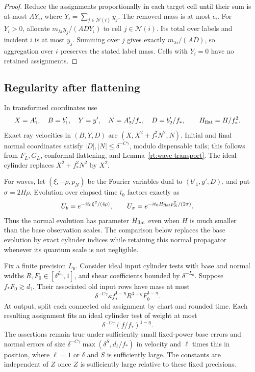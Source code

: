 \begin{proof}
Reduce the assignments proportionally in each target cell until their
sum is at most $A Y_i$, where $Y_i=\sum_{j\in\mathcal N(i)}y_j$.
The removed mass is at most $\epsilon_i$.
For $Y_i>0$, allocate
$m_{\lambda i}y_j/(ADY_i)$ to cell $j\in\mathcal N(i)$.
Its total over labels and incident $i$ is at most $y_j$.
Summing over $j$ gives exactly $m_{\lambda i}/(AD)$, so aggregation
over $i$ preserves the stated label mass.  Cells with $Y_i=0$ have
no retained assignments.
\end{proof}

\subsection{Regularity after flattening}

In transformed coordinates use
\[
 X=A'_1,\quad B=b'_1,\quad Y=y',\quad
 N=A'_2/f_*,\quad D=b'_2/f_* ,\qquad H_{\rm flat}=H/f_*^2.
\]
Exact ray velocities in $(B,Y,D)$ are
$(X,X^2+f_*^2N^2,N)$.  Initial and final normal coordinates satisfy
$|D|,|N|\le\delta^{-C\gamma}$, modulo dispensable tails; this follows
from $F_L,G_L$, conformal flattening, and Lemma~\ref{rt:wave-transport}.
The ideal cylinder replaces $X^2+f_*^2N^2$ by $X^2$.

For waves, let $(\xi,-\rho,p_N)$ be the Fourier variables dual to
$(b'_1,y',D)$, and put $\sigma=2H\rho$.  Evolution over elapsed time
$t_0$ factors exactly as
\begin{equation}\label{rt:flat-propagator}
 U_b=e^{-it_0\xi^2/(4\rho)},\qquad
 U_\sigma=e^{-it_0H_{\rm flat}p_N^2/(2\sigma)}.
\end{equation}
Thus the normal evolution has parameter $H_{\rm flat}$ even when
$H$ is much smaller than the base observation scales.  The comparison
below replaces the base evolution by exact cylinder indices while
retaining this normal propagator whenever its quantum scale is not
negligible.

\begin{lemma}\label{rt:weight-comparison}
Fix a finite precision $L_0$.  Consider ideal input cylinder tests with
base and normal widths $R,F_0\in[\delta^{L_0},1]$, and shear
coefficients bounded by $\delta^{-L_0}$.  Suppose
$f_*F_0\gtrsim d_1$.  Their associated old input rows have mass at most
\begin{equation}
 \delta^{-C\gamma}\kappa f_*^{1-\eta}R^{3+\eta}F_0^{1-\eta}.
 \tag{lift}\label{eq:lift}
\end{equation}
At output, split each connected old assignment by chart and rounded
time.  Each resulting assignment fits an ideal cylinder test of weight
at most
\begin{equation}
 \delta^{-C\gamma}(f/f_*)^{1-\eta}.
 \tag{endlift}\label{eq:endlift}
\end{equation}
The assertions remain true under sufficiently small fixed-power base
errors and normal errors of size
$\delta^{-C\gamma}\max(\delta^S,d_\ell/f_*)$ in velocity and
$\ell$ times this in position, where $\ell=1$ or $\delta$ and
$S$ is sufficiently large.  The constants are independent of $Z$
once $Z$ is sufficiently large relative to these fixed precisions.
\end{lemma}


